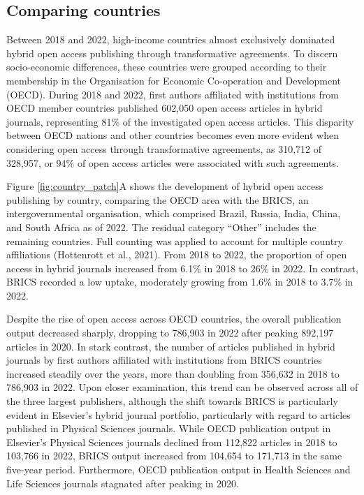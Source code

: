 \documentclass[a4paper,man,floatsintext,longtable,noextraspace,12pt]{apa6}
\begin{document}
\hypertarget{comparing-countries}{%
\subsection{Comparing countries}\label{comparing-countries}}

Between 2018 and 2022, high-income countries almost exclusively
dominated hybrid open access publishing through transformative
agreements. To discern socio-economic differences, these countries were
grouped according to their membership in the Organisation for Economic
Co-operation and Development (OECD). During 2018 and 2022, first authors
affiliated with institutions from OECD member countries published
602,050 open access articles in hybrid journals, representing 81\% of
the investigated open access articles. This disparity between OECD
nations and other countries becomes even more evident when considering
open access through transformative agreements, as 310,712 of 328,957, or
94\% of open access articles were associated with such agreements.

Figure \ref{fig:country_patch}A shows the development of hybrid open
access publishing by country, comparing the OECD area with the BRICS, an
intergovernmental organisation, which comprised Brazil, Russia, India,
China, and South Africa as of 2022. The residual category ``Other''
includes the remaining countries. Full counting was applied to account
for multiple country affiliations (Hottenrott et al., 2021). From 2018
to 2022, the proportion of open access in hybrid journals increased from
6.1\% in 2018 to 26\% in 2022. In contrast, BRICS recorded a low uptake,
moderately growing from 1.6\% in 2018 to 3.7\% in 2022.

Despite the rise of open access across OECD countries, the overall
publication output decreased sharply, dropping to 786,903 in 2022 after
peaking 892,197 articles in 2020. In stark contrast, the number of
articles published in hybrid journals by first authors affiliated with
institutions from BRICS countries increased steadily over the years,
more than doubling from 356,632 in 2018 to 786,903 in 2022. Upon closer
examination, this trend can be observed across all of the three largest
publishers, although the shift towards BRICS is particularly evident in
Elsevier's hybrid journal portfolio, particularly with regard to
articles published in Physical Sciences journals. While OECD publication
output in Elsevier's Physical Sciences journals declined from 112,822
articles in 2018 to 103,766 in 2022, BRICS output increased from 104,654
to 171,713 in the same five-year period. Furthermore, OECD publication
output in Health Sciences and Life Sciences journals stagnated after
peaking in 2020.
\end{document}
